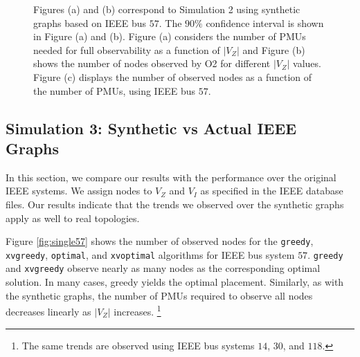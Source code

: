 \begin{figure}[t]
\begin{center}
  \end{center}
	\caption{Figures (a) and (b) correspond to Simulation 2 using synthetic graphs based on IEEE bus $57$. The $90\%$ confidence interval is shown in Figure (a) and (b). 
	Figure (a) considers the number of PMUs needed for full observability as a function of $|V_Z|$ and Figure (b) shows the number of nodes observed by O2 for different $|V_Z|$ values. 
	Figure (c) displays the number of observed nodes as a function of the number of PMUs, using  IEEE bus $57$. }
  \label{fig:sim23}
\end{figure}


\subsection{Simulation 3: Synthetic vs Actual IEEE Graphs}
\label{subsec:ieee}
In this section, we compare our results with the performance over the original IEEE systems. 
We assign nodes to $V_Z$ and $V_I$ as specified in the IEEE database files. Our results indicate that the trends we observed over the synthetic graphs apply as well to real topologies.


Figure \ref{fig:single57} shows the number of observed nodes for the {\tt greedy},  {\tt xvgreedy}, {\tt optimal},  and {\tt xvoptimal} algorithms %
for IEEE bus system $57$. {\tt greedy} and {\tt xvgreedy} observe nearly as many nodes as the corresponding optimal solution.
In many cases, greedy yields the optimal placement. %
Similarly, as with the synthetic graphs, the number of PMUs required to observe all nodes decreases linearly as $|V_Z|$ increases.
{\footnote {\small The same trends are observed using IEEE bus systems $14$, $30$, and $118$.}}

